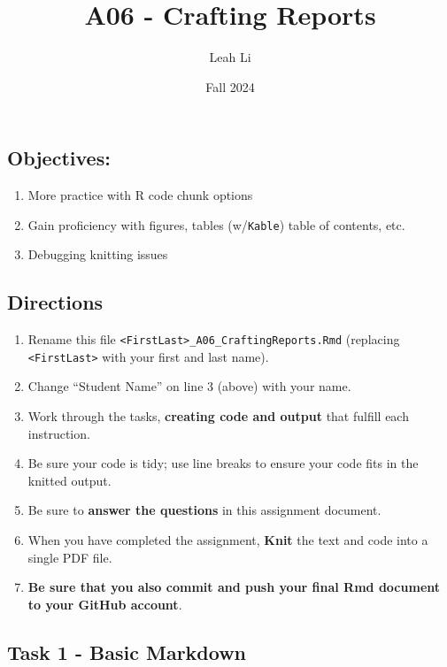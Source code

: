 \documentclass[
]{article}
\title{A06 - Crafting Reports}
\author{Leah Li}
\date{Fall 2024}
\providecommand{\tightlist}{%
  \setlength{\itemsep}{0pt}\setlength{\parskip}{0pt}}
\begin{document}
\maketitle

{
\setcounter{tocdepth}{2}
\tableofcontents
}
\listoffigures
\subsection{Objectives:}\label{objectives}

\begin{enumerate}
\def\labelenumi{\arabic{enumi}.}
\tightlist
\item
  More practice with R code chunk options
\item
  Gain proficiency with figures, tables (w/\texttt{Kable}) table of
  contents, etc.
\item
  Debugging knitting issues
\end{enumerate}

\subsection{Directions}\label{directions}

\begin{enumerate}
\def\labelenumi{\arabic{enumi}.}
\tightlist
\item
  Rename this file
  \texttt{\textless{}FirstLast\textgreater{}\_A06\_CraftingReports.Rmd}
  (replacing \texttt{\textless{}FirstLast\textgreater{}} with your first
  and last name).
\item
  Change ``Student Name'' on line 3 (above) with your name.
\item
  Work through the tasks, \textbf{creating code and output} that fulfill
  each instruction.
\item
  Be sure your code is tidy; use line breaks to ensure your code fits in
  the knitted output.
\item
  Be sure to \textbf{answer the questions} in this assignment document.
\item
  When you have completed the assignment, \textbf{Knit} the text and
  code into a single PDF file.
\item
  \textbf{Be sure that you also commit and push your final Rmd document
  to your GitHub account}.
\end{enumerate}

\subsection{Task 1 - Basic Markdown}\label{task-1---basic-markdown}
\end{document}
